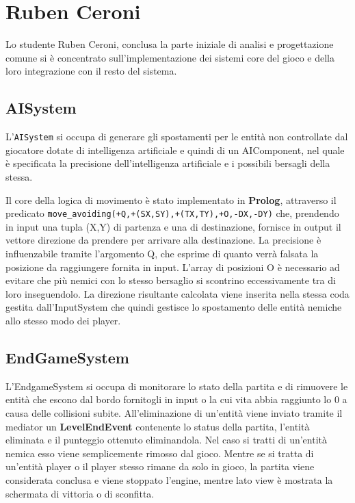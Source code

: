 \section{Ruben Ceroni}


Lo studente Ruben Ceroni, conclusa la parte iniziale di analisi e progettazione comune si è concentrato sull'implementazione dei sistemi core del gioco e della loro integrazione con il resto del sistema.

\subsection{AISystem}
L'\texttt{AISystem} si occupa di generare gli spostamenti per le entità non controllate dal giocatore dotate di intelligenza artificiale e quindi di un AIComponent, nel quale è specificata la precisione dell'intelligenza artificiale e i possibili bersagli della stessa.

Il core della logica di movimento è stato implementato in \textbf{Prolog}, attraverso il predicato \texttt{move\_avoiding(+Q,+(SX,SY),+(TX,TY),+O,-DX,-DY)} che, prendendo in input una tupla (X,Y) di partenza e una di destinazione, fornisce in output il vettore direzione da prendere per arrivare alla destinazione.
La precisione è influenzabile tramite l'argomento Q, che esprime di quanto verrà falsata la posizione da raggiungere fornita in input.
L'array di posizioni O è necessario ad evitare che più nemici con lo stesso bersaglio si scontrino eccessivamente tra di loro inseguendolo.
La direzione risultante calcolata viene inserita nella stessa coda gestita dall'InputSystem che quindi gestisce lo spostamento delle entità nemiche allo stesso modo dei player.

\subsection{EndGameSystem}
L'EndgameSystem si occupa di monitorare lo stato della partita e di rimuovere le entità che escono dal bordo fornitogli in input o la cui vita abbia raggiunto lo 0 a causa delle collisioni subite.
All'eliminazione di un'entità  viene inviato tramite il mediator un \textbf{LevelEndEvent} contenente lo status della partita, l'entità eliminata e il punteggio ottenuto eliminandola.
Nel caso si tratti di un'entità nemica esso viene semplicemente rimosso dal gioco.
Mentre se si tratta di un'entità player o il player stesso rimane da solo in gioco, la partita viene considerata conclusa e viene stoppato l'engine, mentre lato view è mostrata la schermata di vittoria o di sconfitta. 
 

